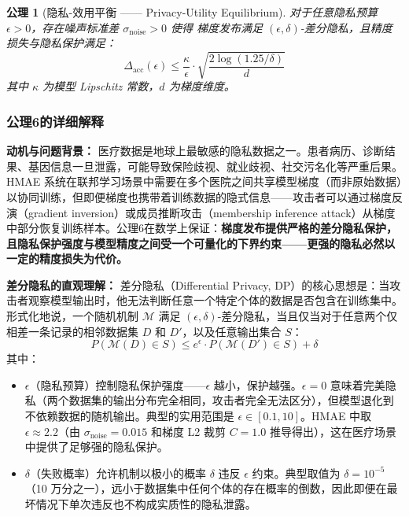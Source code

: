 \documentclass[11pt,a4paper]{ctexart}
\newtheorem{axiom}{公理}[section]
\theoremstyle{remark}
\begin{document}
\begin{axiom}[隐私-效用平衡 —— Privacy-Utility Equilibrium]
\label{ax:privacy}
对于任意隐私预算 $\epsilon > 0$，存在噪声标准差 $\sigma_{\text{noise}} > 0$ 使得
梯度发布满足 $(\epsilon, \delta)$-差分隐私，且精度损失与隐私保护满足：
\begin{equation}
\Delta_{\text{acc}}(\epsilon) \leq \frac{\kappa}{\epsilon} \cdot \sqrt{\frac{2\log(1.25/\delta)}{d}}
\end{equation}
其中 $\kappa$ 为模型 Lipschitz 常数，$d$ 为梯度维度。
\end{axiom}

\subsubsection{公理6的详细解释}

\textbf{动机与问题背景：} 医疗数据是地球上最敏感的隐私数据之一。患者病历、诊断结果、基因信息一旦泄露，可能导致保险歧视、就业歧视、社交污名化等严重后果。HMAE 系统在联邦学习场景中需要在多个医院之间共享模型梯度（而非原始数据）以协同训练，但即便梯度也携带着训练数据的隐式信息——攻击者可以通过梯度反演（gradient inversion）或成员推断攻击（membership inference attack）从梯度中部分恢复训练样本。公理6在数学上保证：\textbf{梯度发布提供严格的差分隐私保护，且隐私保护强度与模型精度之间受一个可量化的下界约束——更强的隐私必然以一定的精度损失为代价。}

\textbf{差分隐私的直观理解：} 差分隐私（Differential Privacy, DP）的核心思想是：当攻击者观察模型输出时，他无法判断任意一个特定个体的数据是否包含在训练集中。形式化地说，一个随机机制 $\mathcal{M}$ 满足 $(\epsilon, \delta)$-差分隐私，当且仅当对于任意两个仅相差一条记录的相邻数据集 $D$ 和 $D'$，以及任意输出集合 $S$：
\[
P(\mathcal{M}(D) \in S) \leq e^{\epsilon} \cdot P(\mathcal{M}(D') \in S) + \delta
\]
其中：
\begin{itemize}[nosep]
\item $\epsilon$（隐私预算）控制隐私保护强度——$\epsilon$ 越小，保护越强。$\epsilon = 0$ 意味着完美隐私（两个数据集的输出分布完全相同，攻击者完全无法区分），但模型退化到不依赖数据的随机输出。典型的实用范围是 $\epsilon \in [0.1, 10]$。HMAE 中取 $\epsilon \approx 2.2$（由 $\sigma_{\text{noise}}=0.015$ 和梯度 L2 裁剪 $C=1.0$ 推导得出），这在医疗场景中提供了足够强的隐私保护。
\item $\delta$（失败概率）允许机制以极小的概率 $\delta$ 违反 $\epsilon$ 约束。典型取值为 $\delta = 10^{-5}$（10 万分之一），远小于数据集中任何个体的存在概率的倒数，因此即便在最坏情况下单次违反也不构成实质性的隐私泄露。
\end{itemize}
\end{document}
